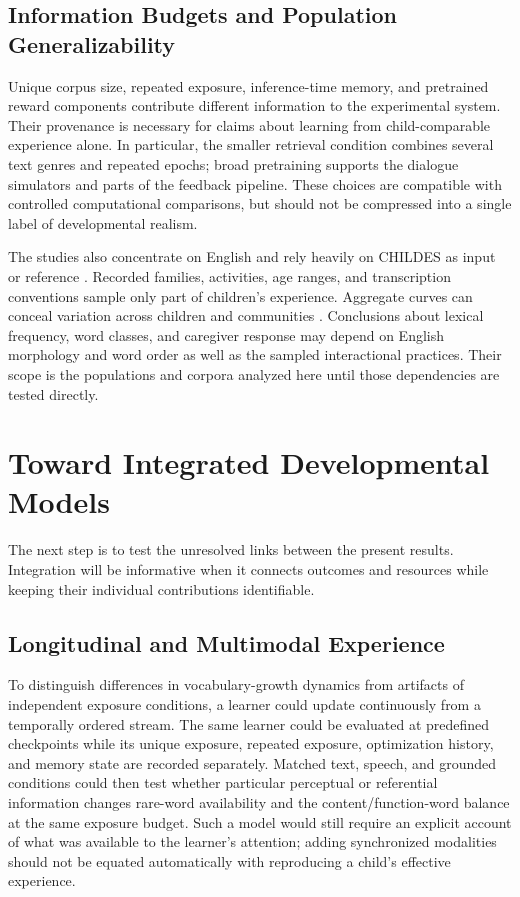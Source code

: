 \subsection{Information Budgets and Population Generalizability}

Unique corpus size, repeated exposure, inference-time memory, and pretrained reward components contribute different information to the experimental system. Their provenance is necessary for claims about learning from child-comparable experience alone. In particular, the smaller retrieval condition combines several text genres and repeated epochs; broad pretraining supports the dialogue simulators and parts of the feedback pipeline. These choices are compatible with controlled computational comparisons, but should not be compressed into a single label of developmental realism.

The studies also concentrate on English and rely heavily on CHILDES as input or reference \citep{macwhinney2000childes}. Recorded families, activities, age ranges, and transcription conventions sample only part of children's experience. Aggregate curves can conceal variation across children and communities \citep{WeislederFernald2013,bergelson2023everyday}. Conclusions about lexical frequency, word classes, and caregiver response may depend on English morphology and word order as well as the sampled interactional practices. Their scope is the populations and corpora analyzed here until those dependencies are tested directly.

\section{Toward Integrated Developmental Models}
\label{sec:gd_future}

The next step is to test the unresolved links between the present results. Integration will be informative when it connects outcomes and resources while keeping their individual contributions identifiable.

\subsection{Longitudinal and Multimodal Experience}

To distinguish differences in vocabulary-growth dynamics from artifacts of independent exposure conditions, a learner could update continuously from a temporally ordered stream. The same learner could be evaluated at predefined checkpoints while its unique exposure, repeated exposure, optimization history, and memory state are recorded separately. Matched text, speech, and grounded conditions could then test whether particular perceptual or referential information changes rare-word availability and the content/function-word balance at the same exposure budget. Such a model would still require an explicit account of what was available to the learner's attention; adding synchronized modalities should not be equated automatically with reproducing a child's effective experience.

